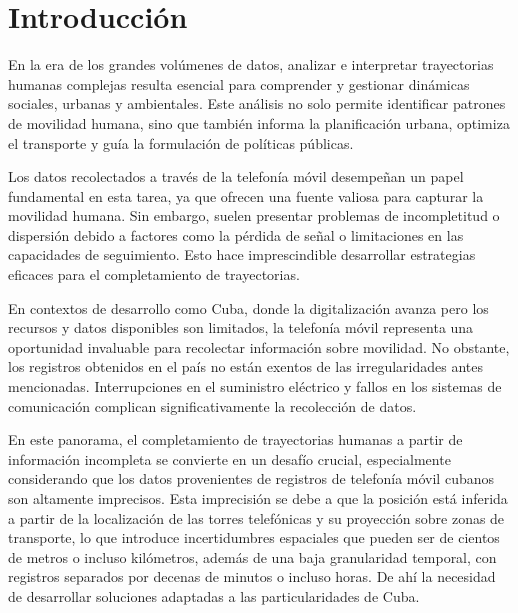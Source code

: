 \chapter*{Introducción}\label{chapter:introduction}

En la era de los grandes volúmenes de datos, analizar e interpretar trayectorias humanas complejas resulta esencial para comprender y gestionar dinámicas sociales, urbanas y ambientales. Este análisis no solo permite identificar patrones de movilidad humana, sino que también informa la planificación urbana, optimiza el transporte y guía la formulación de políticas públicas.

Los datos recolectados a través de la telefonía móvil desempeñan un papel fundamental en esta tarea, ya que ofrecen una fuente valiosa para capturar la movilidad humana. Sin embargo, suelen presentar problemas de incompletitud o dispersión debido a factores como la pérdida de señal o limitaciones en las capacidades de seguimiento. Esto hace imprescindible desarrollar estrategias eficaces para el completamiento de trayectorias.

En contextos de desarrollo como Cuba, donde la digitalización avanza pero los recursos y datos disponibles son limitados, la telefonía móvil representa una oportunidad invaluable para recolectar información sobre movilidad. No obstante, los registros obtenidos en el país no están exentos de las irregularidades antes mencionadas. Interrupciones en el suministro eléctrico y fallos en los sistemas de comunicación complican significativamente la recolección de datos. 

En este panorama, el completamiento de trayectorias humanas a partir de información incompleta se convierte en un desafío crucial, especialmente considerando que los datos provenientes de registros de telefonía móvil cubanos son altamente imprecisos. Esta imprecisión se debe a que la posición está inferida a partir de la localización de las torres telefónicas y su proyección sobre zonas de transporte, lo que introduce incertidumbres espaciales que pueden ser de cientos de metros o incluso kilómetros, además de una baja granularidad temporal, con registros separados por decenas de minutos o incluso horas. De ahí la necesidad de desarrollar soluciones adaptadas a las particularidades de Cuba.

